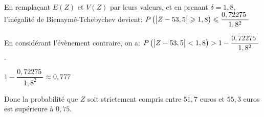 \documentclass[10pt]{article}
\providecommand{\np}[2][]{{#2~#1}}
\begin{document}
\begin{enumerate}[resume]
En remplaçant $E(Z)$ et $V(Z)$ par leurs valeurs, et en prenant $\delta=1,8$, l'inégalité de Bienaymé-Tchebychev devient:
$P\left ( \left |Z-53,5\strut \right | \geqslant 1,8 \right ) \leqslant \dfrac{\np{0,72275}}{1,8^2}$

En considérant l'évènement contraire, on a:
$P\left ( \left |Z-53,5\strut \right | < 1,8 \right ) > 1-  \dfrac{\np{0,72275}}{1,8^2}$.

$1- \dfrac{\np{0,72275}}{1,8^2} \approx 0,777$

Donc la probabilité que $Z$ soit strictement compris entre $51,7$ euros et $55,3$ euros est supérieure à $0,75$.
\end{enumerate}















\bigskip
\end{document}
